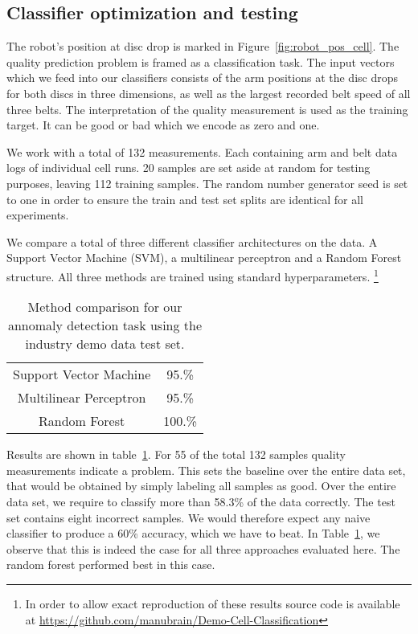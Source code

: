 \documentclass[5p,times,procedia]{elsarticle}
\begin{document}
\subsection{Classifier optimization and testing}\label{sec:ml_exp}
The robot's position at disc drop is marked in 
Figure~\ref{fig:robot_pos_cell}. The quality prediction problem is 
framed as a classification task. The input vectors which we feed into our
classifiers consists of the arm positions at the disc drops for both
discs in three dimensions, as well as the largest recorded belt speed
of all three belts. The interpretation of the quality measurement is 
used as the training target. It can be good or bad which we encode as 
zero and one.

We work with a total of 132 measurements. Each containing arm and belt data
logs of individual cell runs. 20 samples are set aside at random for testing 
purposes, leaving 112 training samples. The random number generator seed is
set to one in order to ensure the train and test set splits are identical 
for all experiments.

We compare a total of three different classifier architectures on the data.
A Support Vector Machine (SVM), a multilinear perceptron and a Random Forest
structure. All three methods are trained using standard hyperparameters.
\footnote{In order to allow exact reproduction of these results source
code is available at \url{https://github.com/manubrain/Demo-Cell-Classification}}
\begin{table}
       \centering
       \begin{tabular}{ c c }
              Support Vector Machine & 95.\% \\
              Multilinear Perceptron & 95.\% \\
              Random Forest          & 100.\%
       \end{tabular}
       \caption{Method comparison for our annomaly detection task 
                using the industry demo data test set.}
       \label{tab:class_comp}
\end{table}
Results are shown in table~\ref{tab:class_comp}. For 55 of the total 132 samples
quality measurements indicate a problem. This sets the 
baseline over the entire data set, that would be obtained by simply labeling all samples
as good. Over the entire data set, we require to classify more than 58.3\% of the data correctly.
The test set contains eight incorrect samples. We would therefore expect any naive classifier
to produce a 60\% accuracy, which we have to beat. In Table~\ref{tab:class_comp},
we observe that this is indeed the case for all three approaches evaluated here.
The random forest performed best in this case.
\end{document}
